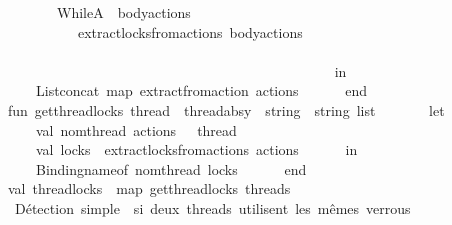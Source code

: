 \begin{isabellebody}
\ \ \ \ \ \ \ \ \ \ {\isacharbar}{\kern0pt}\ WhileA\ {\isacharparenleft}{\kern0pt}{\isacharunderscore}{\kern0pt}{\isacharcomma}{\kern0pt}\ body{\isacharunderscore}{\kern0pt}actions{\isacharparenright}{\kern0pt}\ {\isacharequal}{\kern0pt}{\isachargreater}{\kern0pt}\isanewline
\ \ \ \ \ \ \ \ \ \ \ \ \ \ extract{\isacharunderscore}{\kern0pt}locks{\isacharunderscore}{\kern0pt}from{\isacharunderscore}{\kern0pt}actions\ body{\isacharunderscore}{\kern0pt}actions\isanewline
\ \ \ \ \ \ \ \ \ \ {\isacharbar}{\kern0pt}\ {\isacharunderscore}{\kern0pt}\ {\isacharequal}{\kern0pt}{\isachargreater}{\kern0pt}\ {\isacharbrackleft}{\kern0pt}{\isacharbrackright}{\kern0pt}\ \ \ \ \ \ \ \ \ \ \ \ \ \ \ \ \ \ \ \ \ \ \ \ \ \ \ \ \ \ \ \ \ \ \ \ \ \ \ \ \ \ \ \ \ \ \ \ \ \ \ \ \ \ \ \ \ \ \ \ \ \ \ \ \ \ \ \ \ \ \ \ \ \ \ \ \ \ \ \ \ \ \ \ \ \ \ \ \ \ \ \ \ \ \ \ \ \ \ \ \ \ \ \isanewline
\ \ \ \ \ \ in\isanewline
\ \ \ \ \ \ \ \ List{\isachardot}{\kern0pt}concat\ {\isacharparenleft}{\kern0pt}map\ extract{\isacharunderscore}{\kern0pt}from{\isacharunderscore}{\kern0pt}action\ actions{\isacharparenright}{\kern0pt}\isanewline
\ \ \ \ \ \ end\isanewline
\ \ \ \ \isanewline
\ \ \ \ fun\ get{\isacharunderscore}{\kern0pt}thread{\isacharunderscore}{\kern0pt}locks\ {\isacharparenleft}{\kern0pt}thread\ {\isacharcolon}{\kern0pt}\ thread{\isacharunderscore}{\kern0pt}absy{\isacharparenright}{\kern0pt}\ {\isacharcolon}{\kern0pt}\ string\ {\isacharasterisk}{\kern0pt}\ string\ list\ {\isacharequal}{\kern0pt}\isanewline
\ \ \ \ \ \ let\isanewline
\ \ \ \ \ \ \ \ val\ {\isacharbraceleft}{\kern0pt}nom{\isacharunderscore}{\kern0pt}thread{\isacharcomma}{\kern0pt}\ actions{\isacharcomma}{\kern0pt}\ {\isachardot}{\kern0pt}{\isachardot}{\kern0pt}{\isachardot}{\kern0pt}{\isacharbraceright}{\kern0pt}\ {\isacharequal}{\kern0pt}\ thread\isanewline
\ \ \ \ \ \ \ \ val\ locks\ {\isacharequal}{\kern0pt}\ extract{\isacharunderscore}{\kern0pt}locks{\isacharunderscore}{\kern0pt}from{\isacharunderscore}{\kern0pt}actions\ actions\isanewline
\ \ \ \ \ \ in\isanewline
\ \ \ \ \ \ \ \ {\isacharparenleft}{\kern0pt}Binding{\isachardot}{\kern0pt}name{\isacharunderscore}{\kern0pt}of\ nom{\isacharunderscore}{\kern0pt}thread{\isacharcomma}{\kern0pt}\ locks{\isacharparenright}{\kern0pt}\isanewline
\ \ \ \ \ \ end\isanewline
\ \ \ \ \isanewline
\ \ \ \ val\ thread{\isacharunderscore}{\kern0pt}locks\ {\isacharequal}{\kern0pt}\ map\ get{\isacharunderscore}{\kern0pt}thread{\isacharunderscore}{\kern0pt}locks\ threads\isanewline
\ \ \ \ \isanewline
\ \ \ \ {\isacharparenleft}{\kern0pt}{\isacharasterisk}{\kern0pt}\ Détection\ simple\ {\isacharcolon}{\kern0pt}\ si\ deux\ threads\ utilisent\ les\ mêmes\ verrous\ {\isacharasterisk}{\kern0pt}{\isacharparenright}{\kern0pt}\isanewline

\end{isabellebody}
